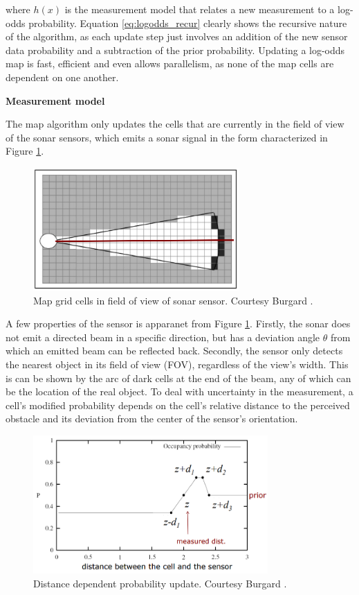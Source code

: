 where $h(x)$ is the measurement model that relates a new measurement to a log-odds probability. Equation \ref{eq:logodds_recur} clearly shows the recursive nature of the algorithm, as each update step just involves an addition of the new sensor data probability and a subtraction of the prior probability. Updating a log-odds map is fast, efficient and even allows parallelism, as none of the map cells are dependent on one another.

\textbf{Measurement model}

The map algorithm only updates the cells that are currently in the field of view of the sonar sensors, which emits a sonar signal in the form characterized in Figure \ref{fig:sonar_grid}.

\begin{figure}[H]
    \centering
    \includegraphics[width=0.7\textwidth]{figures/sonar_grid.png}
    \caption{Map grid cells in field of view of sonar sensor. Courtesy Burgard \cite{burgard_mr}.}
    \label{fig:sonar_grid}
\end{figure}

A few properties of the sensor is apparanet from Figure \ref{fig:sonar_grid}. Firstly, the sonar does not emit a directed beam in a specific direction, but has a deviation angle $\theta$ from which an emitted beam can be reflected back. Secondly, the sensor only detects the nearest object in its field of view (FOV), regardless of the view's width. This is can be shown by the arc of dark cells at the end of the beam, any of which can be the location of the real object. To deal with uncertainty in the measurement, a cell's modified probability depends on the cell's relative distance to the perceived obstacle and its deviation from the center of the sensor's orientation.

\begin{figure}
    \centering
    \includegraphics[width=0.8\textwidth]{figures/sonar_dist_p.png}
    \caption{Distance dependent probability update. Courtesy Burgard \cite{burgard_mr}.}
    \label{fig:sonar_dist_p}
\end{figure}

